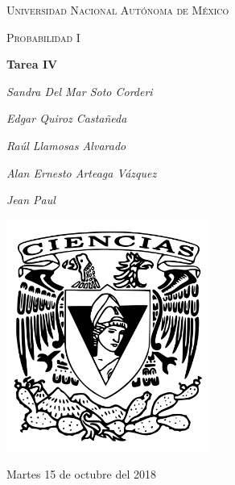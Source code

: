 \documentclass[12pt,a4paper]{report}
\begin{document}
	\begin{titlepage}
		\centering
		{\scshape\LARGE Universidad Nacional Autónoma de México \par}
		\vspace{1cm}
		{\scshape\Large Probabilidad I\par}
		\vspace{1.5cm}
		{\huge\bfseries Tarea IV\par}
		\vspace{.5cm}
		{\Large\itshape Sandra Del Mar Soto Corderi \par}
		\vspace{.5cm}
		{\Large\itshape Edgar Quiroz Castañeda \par}
	    \vspace{.5cm}
		{\Large\itshape Raúl Llamosas Alvarado \par}
		 \vspace{.5cm}
		{\Large\itshape Alan Ernesto Arteaga Vázquez \par}
		 \vspace{.5cm}
		{\Large\itshape Jean Paul \par}
		\vfill
		 \includegraphics[width=0.5\textwidth]{escudo.png}
		\vfill

		{\large Martes 15 de octubre del 2018 \par}
	\end{titlepage}

	\pagebreak
	\setlength{\voffset}{-0.75in}
	\setlength{\headsep}{5pt}
\end{document}
